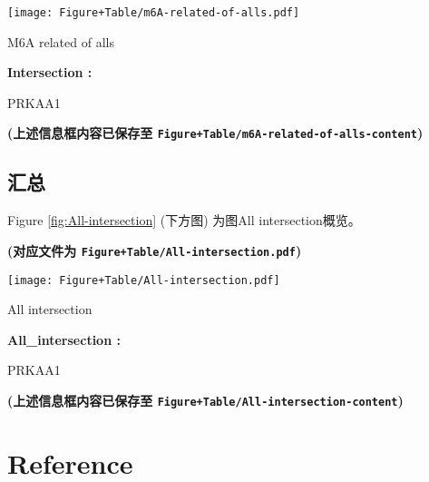 \documentclass[
]{article}
\begin{document}
\def\@captype{figure}
\begin{center}
\texttt{[image: Figure+Table/m6A-related-of-alls.pdf]}
\caption{M6A related of alls}\label{fig:m6A-related-of-alls}
\end{center}
\begin{center}\begin{tcolorbox}[colback=gray!10, colframe=gray!50, width=0.9\linewidth, arc=1mm, boxrule=0.5pt]
\textbf{
Intersection
:}

\vspace{0.5em}

    PRKAA1

\vspace{2em}
\end{tcolorbox}
\end{center}

\textbf{(上述信息框内容已保存至 \texttt{Figure+Table/m6A-related-of-alls-content})}

\hypertarget{ux6c47ux603b}{%
\subsection{汇总}\label{ux6c47ux603b}}

Figure \ref{fig:All-intersection} (下方图) 为图All intersection概览。

\textbf{(对应文件为 \texttt{Figure+Table/All-intersection.pdf})}

\def\@captype{figure}
\begin{center}
\texttt{[image: Figure+Table/All-intersection.pdf]}
\caption{All intersection}\label{fig:All-intersection}
\end{center}
\begin{center}\begin{tcolorbox}[colback=gray!10, colframe=gray!50, width=0.9\linewidth, arc=1mm, boxrule=0.5pt]
\textbf{
All\_intersection
:}

\vspace{0.5em}

    PRKAA1

\vspace{2em}
\end{tcolorbox}
\end{center}

\textbf{(上述信息框内容已保存至 \texttt{Figure+Table/All-intersection-content})}

\hypertarget{bibliography}{%
\section*{Reference}\label{bibliography}}
\end{document}
